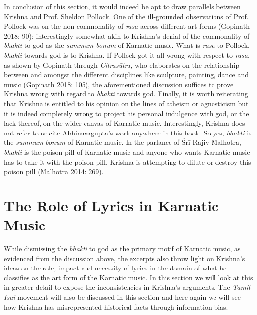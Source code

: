 {In conclusion of this section, it would indeed be apt to draw parallels between Krishna and Prof. Sheldon Pollock. One of the ill-grounded observations of Prof. Pollock was on the non-commonality of \textit{rasa} across different art forms (Gopinath 2018: 90); interestingly somewhat akin to Krishna’s denial of the commonality of \textit{bhakti} to god as the \textit{summum bonum} of Karnatic music. What is \textit{rasa} to Pollock, \textit{bhakti} towards god is to Krishna. If Pollock got it all wrong with respect to \textit{rasa}, as shown by Gopinath through \textit{Citrasūtra,} who elaborates on the relationship between and amongst the different disciplines like sculpture, painting, dance and music (Gopinath 2018: 105), the aforementioned discussion suffices to prove Krishna wrong with regard to \textit{bhakti} towards god. Finally, it is worth reiterating that Krishna is entitled to his opinion on the lines of atheism or agnosticism but it is indeed completely wrong to project his personal indulgence with god, or the lack thereof, on the wider canvas of Karnatic music. Interestingly, Krishna does not refer to or cite Abhinavagupta’s work anywhere in this book. So yes, \textit{bhakti} is the \textit{summum bonum} of Karnatic music. In the parlance of Śrī Rajiv Malhotra, \textit{bhakti} is the poison pill of Karnatic music and anyone who wants Karnatic music has to take it with the poison pill. Krishna is attempting to dilute or destroy this poison pill (Malhotra 2014: 269).

\vspace{-.3cm}

\section*{The Role of Lyrics in Karnatic Music }

\vspace{-.2cm}

While dismissing the \textit{bhakti} to god as the primary motif of Karnatic music, as evidenced from the discussion above, the excerpts also throw light on Krishna’s ideas on the role, impact and necessity of lyrics in the domain of what he classifies as the art form of the Karnatic music. In this section we will look at this in greater detail to expose the inconsistencies in Krishna’s arguments. The \textit{Tamil Isai} movement will also be discussed in this section and here again we will see how Krishna has misrepresented historical facts through information bias.

}
